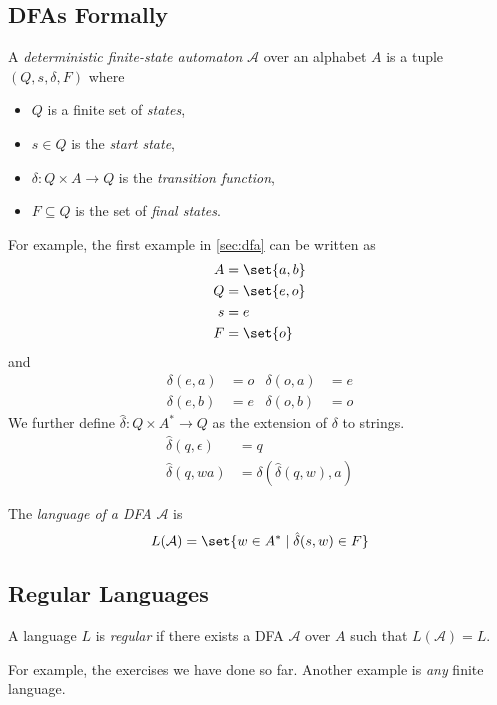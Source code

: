 \subsection{DFAs Formally} \label{sec:dfa:formal}
\begin{definition}[DFA] \label{def:dfa}
    A \emph{deterministic finite-state automaton} $\mathcal{A}$ over an
    alphabet $A$ is a tuple $(Q, s, \delta, F)$ where
    \begin{itemize}
        \item $Q$ is a finite set of \emph{states},
        \item $s \in Q$ is the \emph{start state},
        \item $\delta: Q \times A \to Q$ is the \emph{transition function},
        \item $F \subseteq Q$ is the set of \emph{final states}.
    \end{itemize}
\end{definition}
For example, the first example in \cref{sec:dfa} can be written as
\begin{align*}
    A &= \set{a, b} \\
    Q &= \set{e, o} \\
    s &= e \\
    F &= \set{o}
\end{align*} and \begin{align*}
    \delta(e, a) &= o &\delta(o, a) &= e \\
    \delta(e, b) &= e &\delta(o, b) &= o
\end{align*}
We further define $\hat{\delta} : Q \times A^* \to Q$ as the extension of
$\delta$ to strings.
\begin{align*}
    \hat{\delta}(q, \epsilon) &= q \\
    \hat{\delta}(q, wa) &= \delta(\hat{\delta}(q, w), a)
\end{align*}
\begin{definition} \label{def:dfa:lang}
    The \emph{language of a DFA} $\mathcal{A}$ is
    \begin{equation*}
        L(\mathcal{A}) = \set{w \in A^* \mid \hat{\delta}(s, w) \in F}
    \end{equation*}
\end{definition}

\subsection{Regular Languages} \label{sec:dfa:regular}
\vspace{1em}
\begin{definition} \label{def:regular}
    A language $L$ is \emph{regular} if there exists a DFA $\mathcal{A}$
    over $A$ such that $L(\mathcal{A}) = L$.
\end{definition}
For example, the exercises we have done so far.
Another example is \emph{any} finite language.

